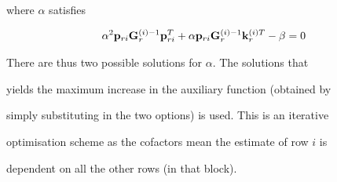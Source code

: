 where $\alpha$ satisfies


\begin{eqnarray}


\alpha^2{\bf p}_{ri}{\bf G}^{(i)-1}_r{\bf p}_{ri}^T +


\alpha{\bf p}_{ri}{\bf G}^{(i)-1}_r{\bf k}^{(i)T}_r - \beta=0\label{eq:alpha_quad}


\end{eqnarray}


There are thus two possible solutions for $\alpha$. The solutions that


yields the maximum increase in the auxiliary function (obtained by


simply substituting in the two options) is used. This is an iterative


optimisation scheme as the cofactors mean the estimate of row $i$ is


dependent on all the other rows (in that block).













